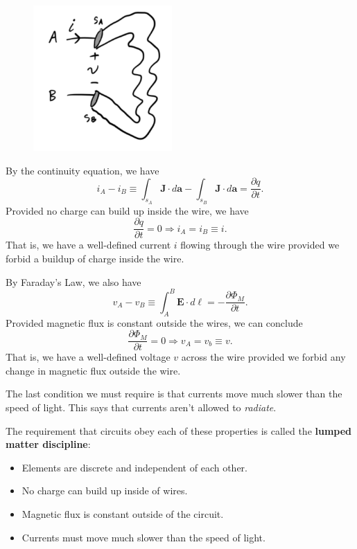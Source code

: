 \documentclass[
  letterpaper,
  DIV=11,
  numbers=noendperiod]{scrreprt}
\providecommand{\tightlist}{%
  \setlength{\itemsep}{0pt}\setlength{\parskip}{0pt}}\usepackage{longtable,booktabs,array}
\begin{document}
\begin{figure}

{\centering \includegraphics[width=2.08333in,height=\textheight]{circuits/./resources/image-20230212054157207.png}

}

\end{figure}

By the continuity equation, we have
\[i_A - i_B \equiv \int_{s_A} \mathbf{J} \cdot d\mathbf{a} - \int_{s_B} \mathbf{J} \cdot d\mathbf{a} = \frac{\partial q}{\partial t}.\]
Provided no charge can build up inside the wire, we have
\[\frac{\partial q}{\partial t} = 0 \Rightarrow i_A = i_B \equiv i.\]
That is, we have a well-defined current \(i\) flowing through the wire
provided we forbid a buildup of charge inside the wire.

By Faraday's Law, we also have
\[v_A - v_B \equiv \int_A^B \mathbf{E} \cdot d \boldsymbol{\ell} = -\frac{\partial \Phi_M}{\partial t}.\]
Provided magnetic flux is constant outside the wires, we can conclude
\[\frac{\partial \Phi_M}{\partial t} = 0 \Rightarrow v_A = v_b \equiv v.\]
That is, we have a well-defined voltage \(v\) across the wire provided
we forbid any change in magnetic flux outside the wire.

The last condition we must require is that currents move much slower
than the speed of light. This says that currents aren't allowed to
\emph{radiate}.

The requirement that circuits obey each of these properties is called
the \textbf{lumped matter discipline}:

\begin{itemize}
\tightlist
\item
  Elements are discrete and independent of each other.
\item
  No charge can build up inside of wires.
\item
  Magnetic flux is constant outside of the circuit.
\item
  Currents must move much slower than the speed of light.
\end{itemize}
\end{document}
